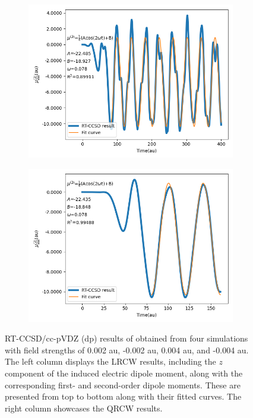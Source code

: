 \begin{figure}
\begin{subfigure}{0.47\textwidth}
         \includegraphics[width=\textwidth]{ch4/Figs/3-3.png}
     \end{subfigure}
     \hfill
     \begin{subfigure}{0.47\textwidth}
         \centering
         \includegraphics[width=\textwidth]{ch4/Figs/3-6.png}
     \end{subfigure}
     \caption{RT-CCSD/cc-pVDZ (dp) results of  obtained from four simulations with field strengths of 0.002 au, -0.002 au, 0.004 au, and -0.004 au. The left column displays the LRCW results, including the $z$ component of the induced electric dipole moment, along with the corresponding first- and second-order dipole moments. These are presented from top to bottom along with their fitted curves. The right column showcases the QRCW results.}
     \label{fig:pol-hyp-fit}
\end{figure}

